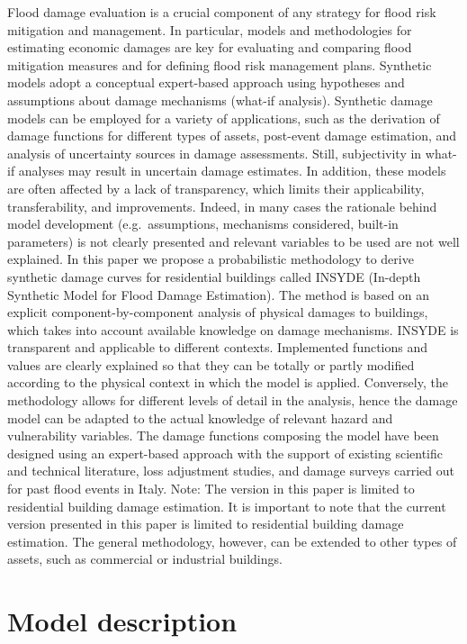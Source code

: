 \documentclass[gc, manuscript]{copernicus}
\begin{document}
Flood damage evaluation is a crucial component of any strategy for flood
risk mitigation and management. In particular, models and methodologies
for estimating economic damages are key for evaluating and comparing
flood mitigation measures and for defining flood risk management plans.
Synthetic models adopt a conceptual expert-based approach using
hypotheses and assumptions about damage mechanisms (what-if analysis).
Synthetic damage models can be employed for a variety of applications,
such as the derivation of damage functions for different types of
assets, post-event damage estimation, and analysis of uncertainty
sources in damage assessments. Still, subjectivity in what-if analyses
may result in uncertain damage estimates. In addition, these models are
often affected by a lack of transparency, which limits their
applicability, transferability, and improvements. Indeed, in many cases
the rationale behind model development (e.g.~assumptions, mechanisms
considered, built-in parameters) is not clearly presented and relevant
variables to be used are not well explained. In this paper we propose a
probabilistic methodology to derive synthetic damage curves for
residential buildings called INSYDE (In-depth Synthetic Model for Flood
Damage Estimation). The method is based on an explicit
component-by-component analysis of physical damages to buildings, which
takes into account available knowledge on damage mechanisms. INSYDE is
transparent and applicable to different contexts. Implemented functions
and values are clearly explained so that they can be totally or partly
modified according to the physical context in which the model is
applied. Conversely, the methodology allows for different levels of
detail in the analysis, hence the damage model can be adapted to the
actual knowledge of relevant hazard and vulnerability variables. The
damage functions composing the model have been designed using an
expert-based approach with the support of existing scientific and
technical literature, loss adjustment studies, and damage surveys
carried out for past flood events in Italy. Note: The version in this
paper is limited to residential building damage estimation. It is
important to note that the current version presented in this paper is
limited to residential building damage estimation. The general
methodology, however, can be extended to other types of assets, such as
commercial or industrial buildings.

\section{Model description}
\end{document}
